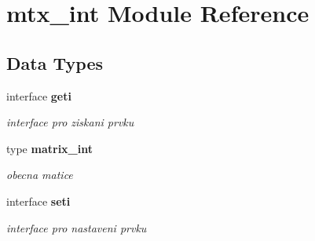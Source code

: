 \section{mtx\+\_\+int Module Reference}
\label{namespacemtx__int}
\subsection*{Data Types}
\begin{DoxyCompactItemize}
\item 
interface {\bf geti}
\begin{DoxyCompactList}\small\item\em interface pro ziskani prvku \end{DoxyCompactList}\item 
type {\bf matrix\+\_\+int}
\begin{DoxyCompactList}\small\item\em obecna matice \end{DoxyCompactList}\item 
interface {\bf seti}
\begin{DoxyCompactList}\small\item\em interface pro nastaveni prvku \end{DoxyCompactList}\end{DoxyCompactItemize}
